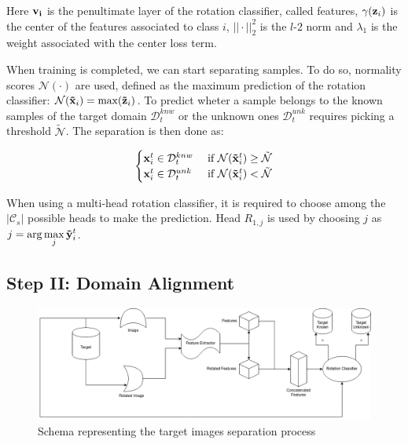 \documentclass[10pt,twocolumn,letterpaper]{article}
\begin{document}
Here ${\bf v_i}$ is the penultimate layer of the rotation classifier,
called features, 
$\gamma({\bf z}_i)$ is the center of the features associated to class $i$,
$||\cdot||_2^2$ is the $l$-2 norm and $\lambda_1$ is the weight associated with the center loss term.

When training is completed, 
we can start separating samples.
To do so,
normality scores $\mathcal{N}(\cdot)$ are used,
defined as the maximum prediction of the rotation classifier:
$\mathcal{N}({\bf\tilde{x}}_i) = \max({\bf\tilde{z}}_i)$.
To predict wheter a sample belongs to the known samples of the target domain $\mathcal{D}_t^{knw}$ or the unknown ones $\mathcal{D}_t^{unk}$ requires picking a threshold $\tilde{\mathcal{N}}$.
The separation is then done as:

\begin{equation}
  \begin{cases}
    {\bf x}_i^t \in \mathcal{D}_t^{knw} & \text{ if } \mathcal{N}({\bf\tilde x}_i^t) \geq \tilde{\mathcal{N}} \\
    {\bf x}_i^t \in \mathcal{D}_t^{unk} & \text{ if } \mathcal{N}({\bf\tilde x}_i^t) < \tilde{\mathcal{N}}
  \end{cases}
  \label{eq:sample_separation}
\end{equation}

When using a multi-head rotation classifier, 
it is required to choose among the $|\mathcal{C}_s|$ possible heads to make the prediction.
Head $R_{1,j}$ is used by choosing $j$ as $\displaystyle j = \arg\max_j {\bf\tilde{y}}_i^t$.

\subsection{Step II: Domain Alignment}
\label{sec:domain_alignment}

\begin{figure}
  \includegraphics[width=\textwidth ]{scheme.png}
  \caption{\label{fig:separation} Schema representing the target images separation process}
\end{figure}
\end{document}
